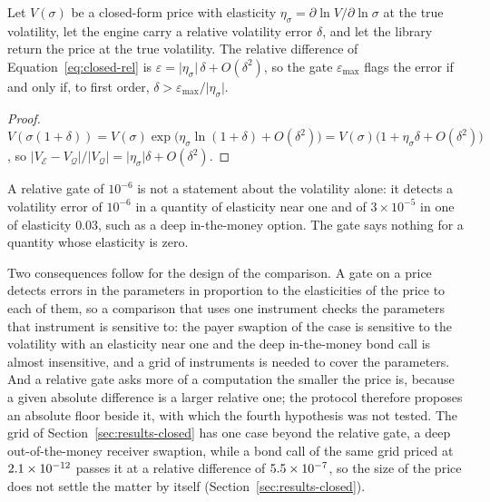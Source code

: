 \begin{proposition}\label{prop:gate}
Let $V(\sigma)$ be a closed-form price with elasticity $\eta_\sigma=\partial\ln V/\partial\ln\sigma$ at the true volatility, let the engine carry a relative volatility error $\delta$, and let the library return the price at the true volatility. The relative difference of Equation~\eqref{eq:closed-rel} is $\varepsilon=\lvert\eta_\sigma\rvert\,\delta+O(\delta^2)$, so the gate $\varepsilon_{\max}$ flags the error if and only if, to first order, $\delta>\varepsilon_{\max}/\lvert\eta_\sigma\rvert$.
\end{proposition}
\begin{proof}
$V(\sigma(1+\delta))=V(\sigma)\exp\bigl(\eta_\sigma\ln(1+\delta)+O(\delta^2)\bigr)=V(\sigma)\bigl(1+\eta_\sigma\delta+O(\delta^2)\bigr)$, so $\lvert V_{\mathcal{E}}-V_{\mathcal{Q}}\rvert/\lvert V_{\mathcal{Q}}\rvert=\lvert\eta_\sigma\rvert\delta+O(\delta^2)$. \qedhere
\end{proof}

A relative gate of $10^{-6}$ is not a statement about the volatility alone: it detects a volatility error of $10^{-6}$ in a quantity of elasticity near one and of $3\times10^{-5}$ in one of elasticity $0.03$, such as a deep in-the-money option. The gate says nothing for a quantity whose elasticity is zero.

Two consequences follow for the design of the comparison. A gate on a price detects errors in the parameters in proportion to the elasticities of the price to each of them, so a comparison that uses one instrument checks the parameters that instrument is sensitive to: the payer swaption of the case is sensitive to the volatility with an elasticity near one and the deep in-the-money bond call is almost insensitive, and a grid of instruments is needed to cover the parameters. And a relative gate asks more of a computation the smaller the price is, because a given absolute difference is a larger relative one; the protocol therefore proposes an absolute floor beside it, with which the fourth hypothesis was not tested. The grid of Section~\ref{sec:results-closed} has one case beyond the relative gate, a deep out-of-the-money receiver swaption, while a bond call of the same grid priced at $2.1\times10^{-12}$ passes it at a relative difference of $5.5\times10^{-7}$, so the size of the price does not settle the matter by itself (Section~\ref{sec:results-closed}).
